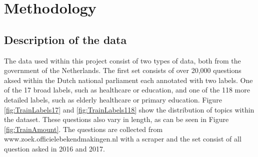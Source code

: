 \section{Methodology}
\label{sec:meth}


\subsection{Description of the data}
The data used within this project consist of two types of data, both from the government of the Netherlands. The first set consists of over 20,000 questions aksed within the Dutch national parliament each annotated with two labels. One of the 17 broad labels, such as healthcare or education, and one of the 118 more detailed labels, such as elderly healthcare or primary education. Figure \ref{fig:TrainLabels17} and \ref{fig:TrainLabels118} show the distribution of topics within the dataset. These questions also vary in length, as can be seen in Figure \ref{fig:TrainAmount}. The questions are collected from www.zoek.officielebekendmakingen.nl with a scraper and the set consist of all question asked in 2016 and 2017. \\

